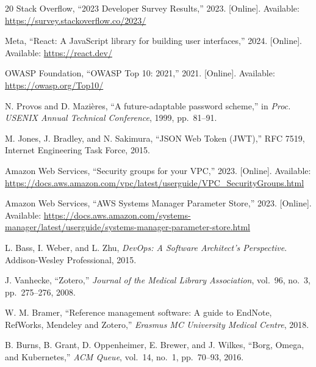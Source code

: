 \documentclass[conference]{IEEEtran}
\begin{document}
\begin{thebibliography}{20}
Stack Overflow, ``2023 Developer Survey Results,'' 2023. [Online]. Available: \url{https://survey.stackoverflow.co/2023/}

Meta, ``React: A JavaScript library for building user interfaces,'' 2024. [Online]. Available: \url{https://react.dev/}

OWASP Foundation, ``OWASP Top 10: 2021,'' 2021. [Online]. Available: \url{https://owasp.org/Top10/}

N. Provos and D. Mazi\`{e}res, ``A future-adaptable password scheme,'' in \textit{Proc. USENIX Annual Technical Conference}, 1999, pp.~81--91.

M. Jones, J. Bradley, and N. Sakimura, ``JSON Web Token (JWT),'' RFC 7519, Internet Engineering Task Force, 2015.

Amazon Web Services, ``Security groups for your VPC,'' 2023. [Online]. Available: \url{https://docs.aws.amazon.com/vpc/latest/userguide/VPC_SecurityGroups.html}

Amazon Web Services, ``AWS Systems Manager Parameter Store,'' 2023. [Online]. Available: \url{https://docs.aws.amazon.com/systems-manager/latest/userguide/systems-manager-parameter-store.html}

L. Bass, I. Weber, and L. Zhu, \textit{DevOps: A Software Architect's Perspective}. Addison-Wesley Professional, 2015.

J. Vanhecke, ``Zotero,'' \textit{Journal of the Medical Library Association}, vol.~96, no.~3, pp.~275--276, 2008.

W. M. Bramer, ``Reference management software: A guide to EndNote, RefWorks, Mendeley and Zotero,'' \textit{Erasmus MC University Medical Centre}, 2018.

B. Burns, B. Grant, D. Oppenheimer, E. Brewer, and J. Wilkes, ``Borg, Omega, and Kubernetes,'' \textit{ACM Queue}, vol.~14, no.~1, pp.~70--93, 2016.

\end{thebibliography}
\end{document}
